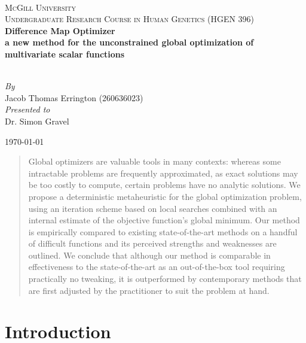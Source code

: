 \documentclass[12pt]{article}
\begin{document}
\begin{titlepage}
    \begin{center}
        ~\\[2.0cm]

        \textsc{\LARGE McGill University}\\[1.5cm]

        \textsc{\Large Undergraduate Research Course in Human Genetics (HGEN 396)}\\[1.0cm]

        {\huge \bfseries Difference Map Optimizer \\ a new method for the unconstrained global optimization of multivariate scalar functions}

        ~\\[2.0cm]

        \emph{By}\\
        Jacob Thomas Errington (260636023)\\[1.0cm]

        \emph{Presented to}\\
        Dr. Simon Gravel

        \vfill

        \today
    \end{center}
\end{titlepage}

\begin{abstract}

Global optimizers are valuable tools in many contexts:
whereas some intractable problems are frequently approximated, as exact
solutions may be too costly to compute, certain problems have no analytic
solutions.
We propose a deterministic metaheuristic for the global optimization
problem, using an iteration scheme based on local searches combined with an
internal estimate of the objective function's global minimum.
Our method is empirically compared to existing state-of-the-art methods on
a handful of difficult functions and its perceived strengths and weaknesses
are outlined.
We conclude that although our method is comparable in effectiveness to the
state-of-the-art as an out-of-the-box tool requiring practically no
tweaking, it is outperformed by contemporary methods that are first
adjusted by the practitioner to suit the problem at hand.

\end{abstract}

\section{Introduction}
\end{document}
